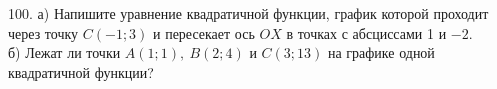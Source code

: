 100. а) Напишите уравнение квадратичной функции, график которой проходит через точку $C(-1;3)$ и пересекает ось $OX$ в точках с абсциссами 1 и $-2.$\\
б) Лежат ли точки $A(1;1),\ B(2;4)$ и $C(3;13)$ на графике одной квадратичной функции?\\

